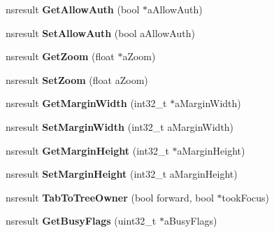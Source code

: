 \begin{DoxyCompactItemize}
nsresult {\bfseries Get\+Allow\+Auth} (bool $\ast$a\+Allow\+Auth)
\item 
\mbox{\label{interfacens_i_doc_shell_a60ec8b41e6c183c650f8ca0e190c88c0}} 
nsresult {\bfseries Set\+Allow\+Auth} (bool a\+Allow\+Auth)
\item 
\mbox{\label{interfacens_i_doc_shell_a6cdeb2330e3abb42df4cf3cb196df813}} 
nsresult {\bfseries Get\+Zoom} (float $\ast$a\+Zoom)
\item 
\mbox{\label{interfacens_i_doc_shell_af39b296793a2d15792d605177b80b34d}} 
nsresult {\bfseries Set\+Zoom} (float a\+Zoom)
\item 
\mbox{\label{interfacens_i_doc_shell_a0cd9a47075ad5592262df936364e2610}} 
nsresult {\bfseries Get\+Margin\+Width} (int32\+\_\+t $\ast$a\+Margin\+Width)
\item 
\mbox{\label{interfacens_i_doc_shell_aa7042b956a2ff73cb1ecb144a5807c66}} 
nsresult {\bfseries Set\+Margin\+Width} (int32\+\_\+t a\+Margin\+Width)
\item 
\mbox{\label{interfacens_i_doc_shell_ad83e7e6b1da2fe4b0b3a43ddf1a84e04}} 
nsresult {\bfseries Get\+Margin\+Height} (int32\+\_\+t $\ast$a\+Margin\+Height)
\item 
\mbox{\label{interfacens_i_doc_shell_acbf1142831df9665a3ba11009b3e2c33}} 
nsresult {\bfseries Set\+Margin\+Height} (int32\+\_\+t a\+Margin\+Height)
\item 
\mbox{\label{interfacens_i_doc_shell_a17b4e4179d15f447e2a9f08365f9c4e3}} 
nsresult {\bfseries Tab\+To\+Tree\+Owner} (bool forward, bool $\ast$took\+Focus)
\item 
\mbox{\label{interfacens_i_doc_shell_a16d749136b512af39a34198c69cee865}} 
nsresult {\bfseries Get\+Busy\+Flags} (uint32\+\_\+t $\ast$a\+Busy\+Flags)
\item 
\mbox{\label{interfacens_i_doc_shell_ac5010d72e06308d663758e40aa66eb70}} 

\end{DoxyCompactItemize}
